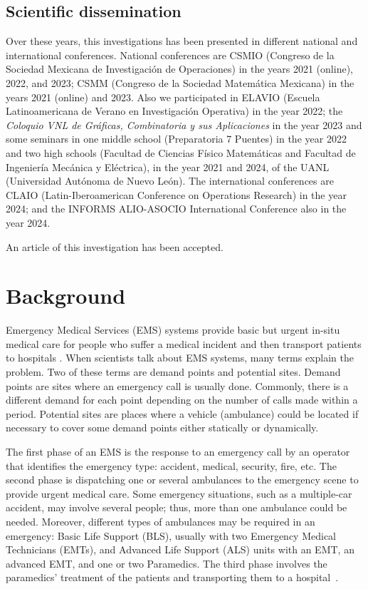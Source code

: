 \section{Scientific dissemination}
Over these years, this investigations has been presented in different national and international conferences. National conferences are CSMIO (Congreso de la Sociedad Mexicana de Investigación de Operaciones) in the years 2021 (online), 2022, and 2023; CSMM (Congreso de la Sociedad Matemática Mexicana) in the years 2021 (online) and 2023. Also we participated in ELAVIO (Escuela Latinoamericana de Verano en Investigación Operativa) in the year 2022; the \textit{Coloquio VNL de Gráficas, Combinatoria y sus Aplicaciones} in the year 2023 and some seminars in one middle school (Preparatoria 7 Puentes) in the year 2022 and two high schools (Facultad de Ciencias Físico Matemáticas and Facultad de Ingeniería Mecánica y Eléctrica), in the year 2021 and 2024, of the UANL (Universidad Autónoma de Nuevo León). The international conferences are CLAIO (Latin-Iberoamerican Conference on Operations Research) in the year 2024; and the INFORMS ALIO-ASOCIO International Conference also in the year 2024.

An article of this investigation has been accepted.  


\chapter{Background}\label{cap:back}

Emergency Medical Services (EMS) systems provide basic but urgent in-situ medical care for people who suffer a medical incident and then transport patients to hospitals \citep{aringhieri2017emergency, belanger2019recent, reuter2017logistics}. When scientists talk about EMS systems, many terms explain the problem. Two of these terms are demand points and potential sites. Demand points are sites where an emergency call is usually done. Commonly, there is a different demand for each point depending on the number of calls made within a period. Potential sites are places where a vehicle (ambulance) could be located if necessary to cover some demand points either statically or dynamically.

The first phase of an EMS is the response to an emergency call by an operator that identifies the emergency type: accident, medical, security, fire, etc. The second phase is dispatching one or several ambulances to the emergency scene to provide urgent medical care. Some emergency situations, such as a multiple-car accident, may involve several people; thus, more than one ambulance could be needed. More\-over, different types of ambulances may be required in an emergency: Basic Life Support (BLS), usually with two Emergency Medical Technicians (EMTs), and Advanced Life Support (ALS) units with an EMT, an advanced EMT, and one or two Paramedics. The third phase involves the paramedics' treatment of the patients and transporting them to a hospital~\citep{aringhieri2017emergency}. 

